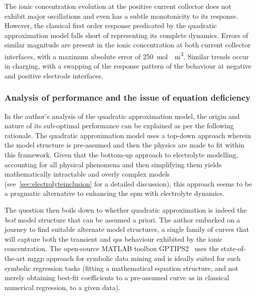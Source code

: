 The ionic  concentration evolution  at the positive  current collector  does not
exhibit major oscillations  and even has a subtle monotonicity  to its response.
However,  the  classical  first  order  response  predicated  by  the  quadratic
approximation model falls short of representing its complete dynamics. Errors of
similar  magnitude  are present  in  the  ionic  concentration at  both  current
collector  interfaces, with  a maximum  absolute error  of \approx\SI{250}{\mole
\per \meter  \cubed}. Similar trends occur  in charging, with a  swapping of the
response pattern of the behaviour at negative and positive electrode interfaces.


\subsubsection*{Analysis of performance and the issue of equation deficiency}
In  the author's  analysis  of  the quadratic  approximation  model, the  origin
and  nature  of  its  sub-optimal  performance  can  be  explained  as  per  the
following  rationale.   The  quadratic  approximation  model   uses  a  top-down
approach wherein  the model structure  is pre-assumed  and then the  physics are
made  to  fit within  this  framework.  Given  that  the bottom-up  approach  to
electrolyte  modelling, \ie{}  accounting for  all physical  phenomena and  then
simplifying  them yields  mathematically intractable  and overly  complex models
(see~\cref{sec:electrolyteinclusion} for  a detailed discussion),  this approach
seems to be a pragmatic alternative  to enhancing the \gls{spm} with electrolyte
dynamics.

The  question then  boils  down  to whether  quadratic  approximation is  indeed
the  \emph{best} model  structure  that  can be  assumed  a  priori. The  author
embarked  on a  journey to  find suitable  alternate model  structures, \ie{}  a
single  family of  curves that  will capture  both the  transient and  \gls{qss}
behaviour exhibited by  the ionic concentration. The  open-source MATLAB toolbox
GPTIPS2~\cite{Searson2015}  uses the  state-of-the-art  \gls{mggp} approach  for
symbolic data  mining and is ideally  suited for such symbolic  regression tasks
(fitting a  mathematical equation structure,  and not merely  obtaining best-fit
coefficients to a  pre-assumed curve as in classical numerical  regression, to a
given data).

